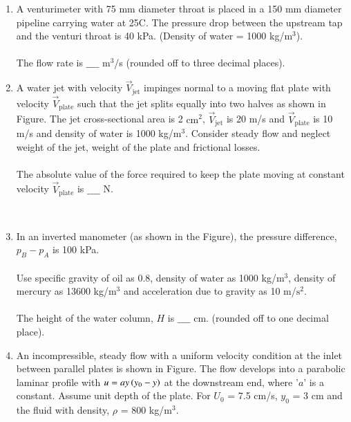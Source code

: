 \documentclass[journal]{IEEEtran}
\begin{document}
\begin{enumerate}
\item A venturimeter with 75 mm diameter throat is placed in a 150 mm diameter pipeline carrying water at 25\degree C. The pressure drop between the upstream tap and the venturi throat is 40 kPa. (Density of water = 1000 kg/$\text{m}^3$). \\\\
The flow rate is $\_\_\_\_$ $\text{m}^3$/s (rounded off to three decimal places). \\
\item A water jet with velocity $\overrightarrow{V}_{\text{jet}}$ impinges normal to a moving flat plate with velocity $\overrightarrow{V}_{\text{plate}}$ such that the jet splits equally into two halves as shown in Figure. The jet cross-sectional area is 2 $\text{cm}^2$, $\overrightarrow{V}_{\text{jet}}$ is 20 m/s and $\overrightarrow{V}_{\text{plate}}$ is 10 m/s and density of water is 1000 kg/$\text{m}^3$. Consider steady flow and neglect weight of the jet, weight of the plate and frictional losses. \\\\
The absolute value of the force required to keep the plate moving at constant velocity $\overrightarrow{V}_{\text{plate}}$ is $\_\_\_\_$ N.
\begin{figure}[!ht]
\centering
\resizebox{0.5\textwidth}{!}{%

}%
\end{figure}\\
\item In an inverted manometer (as shown in the Figure), the pressure difference, $p_B - p_A$ is 100 kPa.\\\\
Use specific gravity of oil as 0.8, density of water as 1000 kg/$\text{m}^3$, density of mercury as 13600 kg/$\text{m}^3$ and acceleration due to gravity as 10 m/$\text{s}^2$. \\\\
The height of the water column, $H$ is $\_\_\_\_$ cm. (rounded off to one decimal place). \\
\begin{figure}[!ht]
\centering
\resizebox{0.5\textwidth}{!}{%

}%
\end{figure}
\item An incompressible, steady flow with a uniform velocity condition at the inlet between parallel plates is shown in Figure. The flow develops into a parabolic laminar profile with $u = ay\left(y_0 - y\right)$ at the downstream end, where '$a$' is a constant. Assume unit depth of the plate. For $U_0$ = 7.5 cm/s, $y_0$ = 3 cm and the fluid with density, $\rho$ = 800 kg/$\text{m}^3$. \\\\

\end{enumerate}
\end{document}
